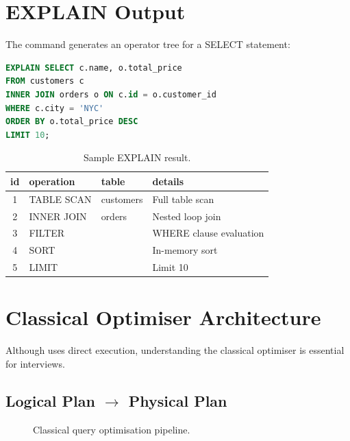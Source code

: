 \section{EXPLAIN Output}

The  command generates an operator tree for a SELECT statement:

\begin{lstlisting}[language=SQL, caption={Example EXPLAIN output.}]
EXPLAIN SELECT c.name, o.total_price
FROM customers c
INNER JOIN orders o ON c.id = o.customer_id
WHERE c.city = 'NYC'
ORDER BY o.total_price DESC
LIMIT 10;
\end{lstlisting}

\begin{table}[H]
\centering
\caption{Sample EXPLAIN result.}
\begin{tabular}{c l l l}
\toprule
\textbf{id} & \textbf{operation} & \textbf{table} & \textbf{details} \\
\midrule
1 & TABLE SCAN   & customers & Full table scan \\
2 & INNER JOIN   & orders    & Nested loop join \\
3 & FILTER       &           & WHERE clause evaluation \\
4 & SORT         &           & In-memory sort \\
5 & LIMIT        &           & Limit 10 \\
\bottomrule
\end{tabular}
\end{table}

\section{Classical Optimiser Architecture}

Although \shiftdb{} uses direct execution, understanding the classical optimiser is essential for interviews.

\subsection{Logical Plan $\to$ Physical Plan}

\begin{figure}[H]
\centering
{}
\caption{Classical query optimisation pipeline.}
\end{figure}

